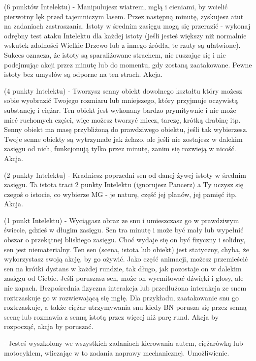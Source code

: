 {  (6 punktów Intelektu) - Manipulujesz wiatrem, mglą i cieniami, by wcielić pierwotny lęk przed tajemniczym lasem. Przez następną minutę, zyskujesz atut na zadaniach zastraszania. Istoty w średnim zasięgu mogą się przerazić - wykonaj odrębny test ataku Intelektu dla każdej istoty (jeśli jesteś większy niż normalnie wskutek zdolności Wielkie Drzewo lub z innego źródła, te rzuty są ułatwione). Sukces oznacza, że istoty są sparaliżowane strachem, nie ruszając się i nie podejmując akcji przez minutę lub do momentu, gdy zostaną zaatakowane. Pewne istoty bez umysłów są odporne na ten strach. Akcja.
 
 (4 punkty Intelektu) - Tworzysz senny obiekt dowolnego kształtu który możesz sobie wyobrazić Twojego rozmiaru lub mniejszego, który przyjmuje oczywistą substancję i ciężar. Ten obiekt jest wykonany bardzo prymitywnie i nie może mieć ruchomych części, więc możesz tworzyć miecz, tarczę, krótką drabinę itp. Senny obiekt ma masę przybliżoną do prawdziwego obiektu, jeśli tak wybierzesz. Twoje senne obiekty są wytrzymałe jak żelazo, ale jeśli nie zostajesz w dalekim zasięgu od nich, funkcjonują tylko przez minutę, zanim się rozwieją w nicość. Akcja.

 (2 punkty Intelektu) - Kradniesz poprzedni sen od danej żywej istoty w średnim zasięgu. Ta istota traci 2 punkty Intelektu (ignorujesz Pancerz) a Ty uczysz się czegoś o istocie, co wybierze MG - je naturę, część jej planów, jej pamięć itp. Akcja.

 (1 punkt Intelektu) - Wyciągasz obraz ze snu i umieszczasz go w prawdziwym świecie, gdzieś w długim zasięgu. Sen tra minutę i może być mały lub wypełnić obszar o przekątnej bliskiego zasięgu. Choć wydaje się on być fizyczny i solidny, sen jest niematerialny. Ten sen (scena, istota lub obiekt) jest statyczny, chyba, że wykorzystasz swoją akcję, by go ożywić. Jako część animacji, możesz przemieścić sen na krótki dystans w każdej rundzie, tak długo, jak pozostaje on w dalekim zasięgu od Ciebie. Jeśli poruszasz sen, może on wyemitować dźwięki i głosy, ale nie zapach. Bezpośrednia fizyczna interakcja lub przedłużona interakcja ze snem roztrzaskuje go w rozwiewającą się mgłę. Dla przykładu, zaatakowanie snu go roztrzaskuje, a także ciężar utrzymywania snu kiedy BN porusza się przez senną scenę lub rozmawia z senną istotą przez więcej niż parę rund. Akcja by rozpocząć, akcja by poruszać.  

 - Jesteś wyszkolony we wszystkich zadaniach kierowania autem, ciężarówką lub motocyklem, wliczając w to zadania naprawy mechanicznej. Umożliwienie. 

}
